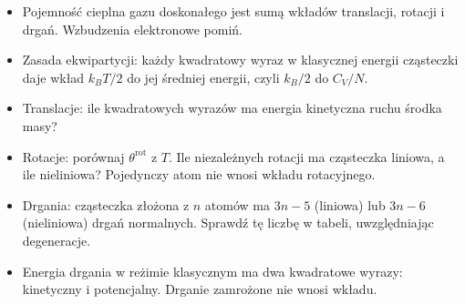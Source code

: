 \begin{wskazowki}
    \begin{itemize}
      \item Pojemność cieplna gazu doskonałego jest sumą wkładów translacji,
        rotacji i drgań. Wzbudzenia elektronowe pomiń.
      \item Zasada ekwipartycji: każdy kwadratowy wyraz w klasycznej energii
        cząsteczki daje wkład $k_BT/2$ do jej średniej energii, czyli $k_B/2$
        do $C_V/N$.
      \item Translacje: ile kwadratowych wyrazów ma energia kinetyczna ruchu
        środka masy?
      \item Rotacje: porównaj $\theta^\text{rot}$ z $T$. Ile niezależnych
        rotacji ma cząsteczka liniowa, a ile nieliniowa? Pojedynczy atom nie
        wnosi wkładu rotacyjnego.
      \item Drgania: cząsteczka złożona z $n$ atomów ma $3n - 5$ (liniowa) lub
        $3n - 6$ (nieliniowa) drgań normalnych. Sprawdź tę liczbę w tabeli,
        uwzględniając degeneracje.
      \item Energia drgania w reżimie klasycznym ma dwa kwadratowe wyrazy:
        kinetyczny i potencjalny. Drganie zamrożone nie wnosi wkładu.
    \end{itemize}
\end{wskazowki}

